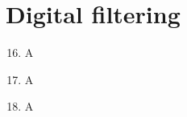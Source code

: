 \documentclass[a4paper,12pt]{article}
\begin{document}
\newpage
\section{Digital filtering}

\begin{enumerate}[label={\color{blue}\arabic*)}]
    \setcounter{enumi}{15}

    \item
    A

    \item
    A

    \item
    A

\end{enumerate}
\end{document}
